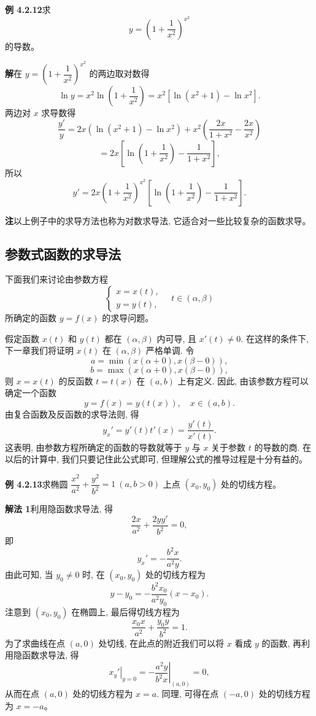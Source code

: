 \documentclass[UTF8,12pt,a4paper,fontset=fandol]{ctexart}
\begin{document}
\noindent\textbf{例 4.2.12}\quad 求
\[
  y=\left(1+\frac1{x^2}\right)^{x^2}
\]
的导数。

\noindent\textbf{解}\quad 在 $y=\left(1+\dfrac1{x^2}\right)^{x^2}$ 的两边取对数得
\[
  \ln y=x^2\ln\left(1+\frac1{x^2}\right)
  =
  x^2[\ln(x^2+1)-\ln x^2].
\]
两边对 $x$ 求导数得
\[
  \frac{y'}y
  =
  2x(\ln(x^2+1)-\ln x^2)
  +
  x^2\left(\frac{2x}{1+x^2}-\frac{2x}{x^2}\right)
\]
\[
  =
  2x\left[\ln\left(1+\frac1{x^2}\right)-\frac1{1+x^2}\right],
\]
所以
\[
  y'=2x\left(1+\frac1{x^2}\right)^{x^2}
  \left[\ln\left(1+\frac1{x^2}\right)-\frac1{1+x^2}\right].
\]

\noindent\textbf{注}\quad 以上例子中的求导方法也称为对数求导法, 它适合对一些比较复杂的函数求导。

\subsection{参数式函数的求导法}

下面我们来讨论由参数方程
\[
  \begin{cases}
    x=x(t),\\
    y=y(t),
  \end{cases}
  \quad t\in(\alpha,\beta)
\]
所确定的函数 $y=f(x)$ 的求导问题。

假定函数 $x(t)$ 和 $y(t)$ 都在 $(\alpha,\beta)$ 内可导, 且 $x'(t)\ne0$. 在这样的条件下, 下一章我们将证明 $x(t)$ 在 $(\alpha,\beta)$ 严格单调. 令
\[
  a=\min(x(\alpha+0),x(\beta-0)),
\]
\[
  b=\max(x(\alpha+0),x(\beta-0)),
\]
则 $x=x(t)$ 的反函数 $t=t(x)$ 在 $(a,b)$ 上有定义. 因此, 由该参数方程可以确定一个函数
\[
  y=f(x)=y(t(x)),\quad x\in(a,b).
\]
由复合函数及反函数的求导法则, 得
\[
  y_x'=y'(t)t'(x)=\frac{y'(t)}{x'(t)}.
\]
这表明, 由参数方程所确定的函数的导数就等于 $y$ 与 $x$ 关于参数 $t$ 的导数的商. 在以后的计算中, 我们只要记住此公式即可, 但理解公式的推导过程是十分有益的。

\noindent\textbf{例 4.2.13}\quad 求椭圆 $\dfrac{x^2}{a^2}+\dfrac{y^2}{b^2}=1\ (a,b>0)$ 上点 $(x_0,y_0)$ 处的切线方程。

\noindent\textbf{解法 1}\quad 利用隐函数求导法, 得
\[
  \frac{2x}{a^2}+\frac{2yy'}{b^2}=0,
\]
即
\[
  y_x'=-\frac{b^2x}{a^2y}.
\]
由此可知, 当 $y_0\ne0$ 时, 在 $(x_0,y_0)$ 处的切线方程为
\[
  y-y_0=-\frac{b^2x_0}{a^2y_0}(x-x_0).
\]
注意到 $(x_0,y_0)$ 在椭圆上, 最后得切线方程为
\[
  \frac{x_0x}{a^2}+\frac{y_0y}{b^2}=1.
\]
为了求曲线在点 $(a,0)$ 处切线, 在此点的附近我们可以将 $x$ 看成 $y$ 的函数, 再利用隐函数求导法, 得
\[
  \left.x_y'\right|_{y=0}
  =
  -\left.\frac{a^2y}{b^2x}\right|_{(a,0)}
  =
  0,
\]
从而在点 $(a,0)$ 处的切线方程为 $x=a$. 同理, 可得在点 $(-a,0)$ 处的切线方程为 $x=-a$。
\end{document}
